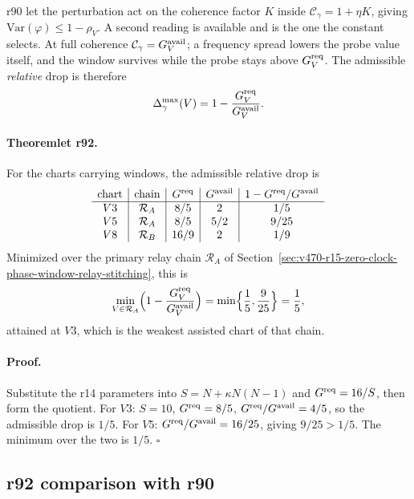 r90 let the perturbation act on the coherence factor \(K\) inside
\(\mathcal C_\gamma=1+\eta K\), giving \(\mathrm{Var}(\varphi)\le1-\rho_V\).  A second reading
is available and is the one the constant selects.  At full coherence
\(\mathcal C_\gamma=G_V^{\rm avail}\); a frequency spread lowers the probe value itself, and
the window survives while the probe stays above \(G_V^{\rm req}\).  The admissible
\emph{relative} drop is therefore
\[
\Delta_\gamma^{\max}(V)=1-\frac{G_V^{\rm req}}{G_V^{\rm avail}} .
\]

\paragraph{Theoremlet r92.}
For the charts carrying windows, the admissible relative drop is
\[
\begin{array}{c|c|c|c|c}
\text{chart} & \text{chain} & G^{\rm req} & G^{\rm avail} & 1-G^{\rm req}/G^{\rm avail}\\
\hline
V3 & \mathcal R_A & 8/5 & 2 & 1/5\\
V5 & \mathcal R_A & 8/5 & 5/2 & 9/25\\
V8 & \mathcal R_B & 16/9 & 2 & 1/9
\end{array}
\]
Minimized over the primary relay chain \(\mathcal R_A\) of
Section~\ref{sec:v470-r15-zero-clock-phase-window-relay-stitching}, this is
\[
\min_{V\in\mathcal R_A}\Bigl(1-\frac{G_V^{\rm req}}{G_V^{\rm avail}}\Bigr)
=\min\Bigl\{\frac15,\frac9{25}\Bigr\}
=\frac15 ,
\]
attained at \(V3\), which is the weakest assisted chart of that chain.

\paragraph{Proof.}
Substitute the r14 parameters into \(S=N+\kappa N(N-1)\) and \(G^{\rm req}=16/S\), then form
the quotient.  For \(V3\): \(S=10\), \(G^{\rm req}=8/5\), \(G^{\rm req}/G^{\rm avail}=4/5\),
so the admissible drop is \(1/5\).  For \(V5\): \(G^{\rm req}/G^{\rm avail}=16/25\), giving
\(9/25>1/5\).  The minimum over the two is \(1/5\). \(\square\)

\subsection*{r92 comparison with r90}
\label{subsec:r92-comparison}

